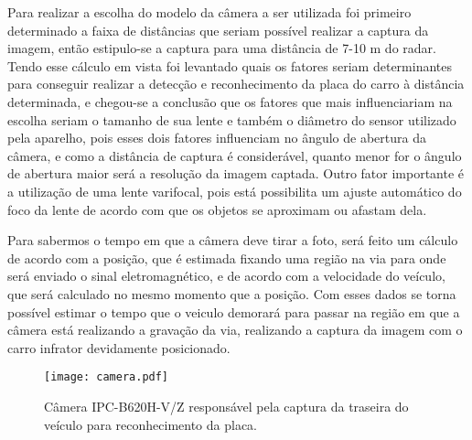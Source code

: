     Para realizar a escolha do modelo da câmera a ser utilizada foi primeiro determinado a faixa de distâncias que seriam possível realizar a captura da imagem, então estipulo-se a captura para uma distância de 7-10 m do radar. Tendo esse cálculo em vista foi levantado quais os fatores seriam determinantes para conseguir realizar a detecção e reconhecimento da placa do carro à distância determinada, e chegou-se a conclusão que os fatores que mais influenciariam na escolha seriam o tamanho de sua lente e também o diâmetro do sensor utilizado pela aparelho, pois esses dois fatores influenciam no ângulo de abertura da câmera, e como a distância de captura é considerável, quanto menor for o ângulo de abertura maior será a resolução da imagem captada. Outro fator importante é a utilização de uma lente varifocal, pois está possibilita um ajuste automático do foco da lente de acordo com que os objetos se aproximam ou afastam dela. 
    
    
    Para sabermos o tempo em que a câmera deve tirar a foto, será feito um cálculo de acordo com a posição, que é estimada fixando uma região na via para onde será enviado o sinal eletromagnético, e de acordo com a velocidade do veículo, que  será calculado no mesmo momento que a posição. Com esses dados se torna possível estimar o tempo que o veiculo demorará para passar na região em que a câmera está realizando a gravação da via, realizando a captura da imagem com o carro infrator devidamente posicionado.
    \begin{figure}[H]
    \centering
    \texttt{[image: camera.pdf]}
    \caption{Câmera IPC-B620H-V/Z responsável pela captura da traseira do veículo para reconhecimento da placa.}
    \label{camera}
\end{figure}
